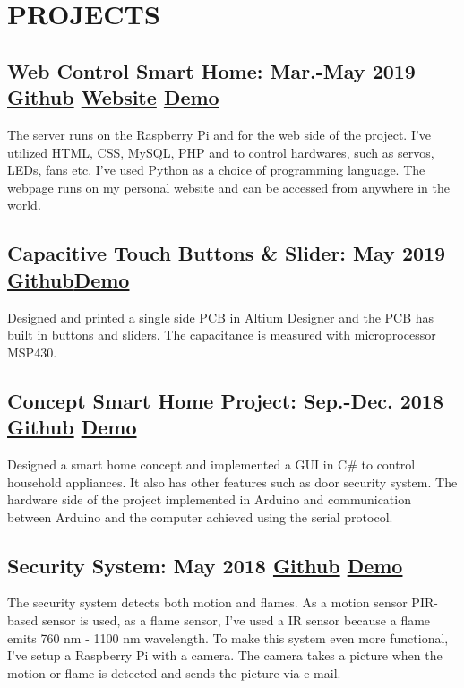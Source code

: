\documentclass[8pt]{article}
\begin{document}
\section{PROJECTS}




\subsection{Web Control Smart Home: Mar.-May 2019 \textcolor{Mycolor3}{\href{https://github.com/Zrrck/Web-Control-Smart-Home}{\small{Github}}} \textcolor{Mycolor4}{\href{http://webtek.cetinkaya.co}{\small{Website}}}
\textcolor{Mycolor2}{\href{https://youtu.be/G7QD9RP_mmE}{\small{Demo}}}} 
The server runs on the Raspberry Pi and for the web side of the project. I've utilized HTML, CSS, MySQL, PHP and to control
hardwares, such as servos, LEDs, fans etc. I've used Python as a choice of programming language. The webpage runs on my personal website and can be accessed from anywhere in the world.



\subsection{Capacitive Touch Buttons \& Slider: May 2019  
\textcolor{Mycolor3}{\href{https://github.com/Zrrck/Capacitive-Touch-Implementation-}{\small{Github}}}\textcolor{Mycolor2}{\href{https://youtu.be/4U37eLWOmPw} {\small{Demo}}}} 
Designed and printed a single side PCB in Altium Designer and 
the PCB has built in buttons and sliders. The capacitance is measured with microprocessor MSP430.

\subsection{Concept Smart Home Project: Sep.-Dec. 2018 \textcolor{Mycolor3}{\href{https://github.com/Zrrck/Like-a-Smart-Home-but-Not}{\small{Github}}}
\textcolor{Mycolor2}{\href{https://youtu.be/kD4CY6Yt-gg}{\small{Demo}}}}
Designed a smart home concept and implemented a GUI in C\# to control household appliances. It also has other features such as door security system. The hardware side of the project implemented in Arduino and communication between Arduino and the computer achieved using the serial protocol.


\subsection{Security System: May 2018 \textcolor{Mycolor3}{\href{https://github.com/Zrrck/Raspberry-Pi-Fire-Security-System}{\small{Github}}}
\textcolor{Mycolor2}{\href{https://youtu.be/s6VeqZgOBLw}{\small{Demo}}}}
The security system detects both motion and flames. As a motion sensor PIR-based sensor is used, 
as a flame sensor, I've used a IR sensor because a flame emits 760 nm - 1100 nm wavelength. To make this system even more functional, I've setup a Raspberry Pi with a camera. The camera takes a picture when the motion or flame is detected and sends the picture via e-mail.  
\end{document}
